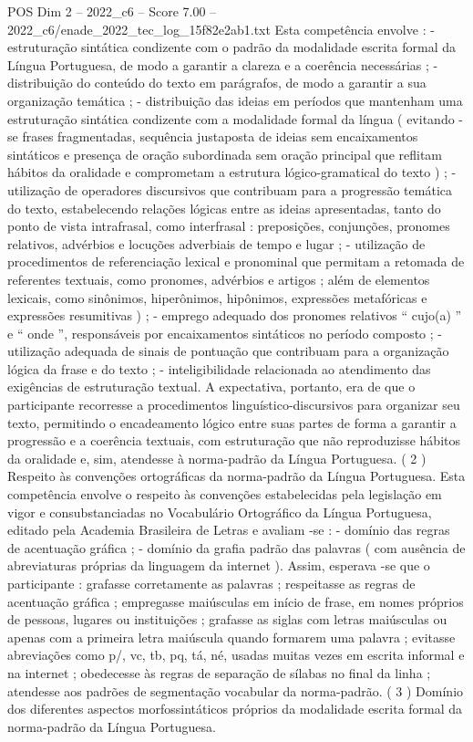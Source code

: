 \begin{textsample}{POS Dim 2 – 2022\_c6 – Score 7.00 – 2022\_c6/enade\_2022\_tec\_log\_15f82e2ab1.txt}
Esta competência envolve : - estruturação sintática condizente com o padrão da modalidade escrita formal da Língua Portuguesa, de modo a garantir a clareza e a coerência necessárias ; - distribuição do conteúdo do texto em parágrafos, de modo a garantir a sua organização temática ; - distribuição das ideias em períodos que mantenham uma estruturação sintática condizente com a modalidade formal da língua ( evitando -se frases fragmentadas, sequência justaposta de ideias sem encaixamentos sintáticos e presença de oração subordinada sem oração principal que reflitam hábitos da oralidade e comprometam a estrutura lógico-gramatical do texto ) ; - utilização de operadores discursivos que contribuam para a progressão temática do texto, estabelecendo relações lógicas entre as ideias apresentadas, tanto do ponto de vista intrafrasal, como interfrasal : preposições, conjunções, pronomes relativos, advérbios e locuções adverbiais de tempo e lugar ; - utilização de procedimentos de referenciação lexical e pronominal que permitam a retomada de referentes textuais, como pronomes, advérbios e artigos ; além de elementos lexicais, como sinônimos, hiperônimos, hipônimos, expressões metafóricas e expressões resumitivas ) ; - emprego adequado dos pronomes relativos “ cujo(a) ” e “ onde ”, responsáveis por encaixamentos sintáticos no período composto ; - utilização adequada de sinais de pontuação que contribuam para a organização lógica da frase e do texto ; - inteligibilidade relacionada ao atendimento das exigências de estruturação textual.
A expectativa, portanto, era de que o participante recorresse a procedimentos linguístico-discursivos para organizar seu texto, permitindo o encadeamento lógico entre suas partes de forma a garantir a progressão e a coerência textuais, com estruturação que não reproduzisse hábitos da oralidade e, sim, atendesse à norma-padrão da Língua Portuguesa. ( 2 ) Respeito às convenções ortográficas da norma-padrão da Língua Portuguesa.
Esta competência envolve o respeito às convenções estabelecidas pela legislação em vigor e consubstanciadas no Vocabulário Ortográfico da Língua Portuguesa, editado pela Academia Brasileira de Letras e avaliam -se : - domínio das regras de acentuação gráfica ; - domínio da grafia padrão das palavras ( com ausência de abreviaturas próprias da linguagem da internet ).
Assim, esperava -se que o participante : grafasse corretamente as palavras ; respeitasse as regras de acentuação gráfica ; empregasse maiúsculas em início de frase, em nomes próprios de pessoas, lugares ou instituições ; grafasse as siglas com letras maiúsculas ou apenas com a primeira letra maiúscula quando formarem uma palavra ; evitasse abreviações como p/, vc, tb, pq, tá, né, usadas muitas vezes em escrita informal e na internet ; obedecesse às regras de separação de sílabas no final da linha ; atendesse aos padrões de segmentação vocabular da norma-padrão. ( 3 ) Domínio dos diferentes aspectos morfossintáticos próprios da modalidade escrita formal da norma-padrão da Língua Portuguesa.

\end{textsample}
